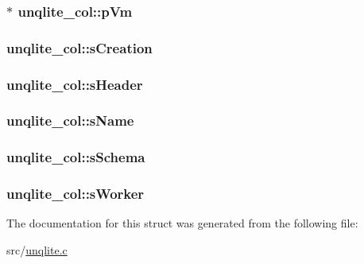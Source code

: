 \hypertarget{structunqlite__col_a4b6b693f598b3619ebbc9478f90a9a98}{
\subsubsection[{p\-Vm}]{$\ast$ unqlite\-\_\-col\-::p\-Vm}}\label{dc/de4/structunqlite__col_a4b6b693f598b3619ebbc9478f90a9a98}
\hypertarget{structunqlite__col_a202b5645ae91b6fa4db9eccdd402f41c}{
\subsubsection[{s\-Creation}]{ unqlite\-\_\-col\-::s\-Creation}}\label{dc/de4/structunqlite__col_a202b5645ae91b6fa4db9eccdd402f41c}
\hypertarget{structunqlite__col_a371d279f270fe4f4bf4ab6c2fd4b2d1c}{
\subsubsection[{s\-Header}]{ unqlite\-\_\-col\-::s\-Header}}\label{dc/de4/structunqlite__col_a371d279f270fe4f4bf4ab6c2fd4b2d1c}
\hypertarget{structunqlite__col_aa9d93ceab4d1b8ab0c93f02da06cd17d}{
\subsubsection[{s\-Name}]{ unqlite\-\_\-col\-::s\-Name}}\label{dc/de4/structunqlite__col_aa9d93ceab4d1b8ab0c93f02da06cd17d}
\hypertarget{structunqlite__col_a0dfa1f86f966d8c89e4b7ed86bcb081a}{
\subsubsection[{s\-Schema}]{ unqlite\-\_\-col\-::s\-Schema}}\label{dc/de4/structunqlite__col_a0dfa1f86f966d8c89e4b7ed86bcb081a}
\hypertarget{structunqlite__col_a6999264f4ce488694945d3e050f98011}{
\subsubsection[{s\-Worker}]{ unqlite\-\_\-col\-::s\-Worker}}\label{dc/de4/structunqlite__col_a6999264f4ce488694945d3e050f98011}


The documentation for this struct was generated from the following file\-:\begin{DoxyCompactItemize}
\item 
src/\hyperlink{unqlite_8c}{unqlite.\-c}\end{DoxyCompactItemize}
